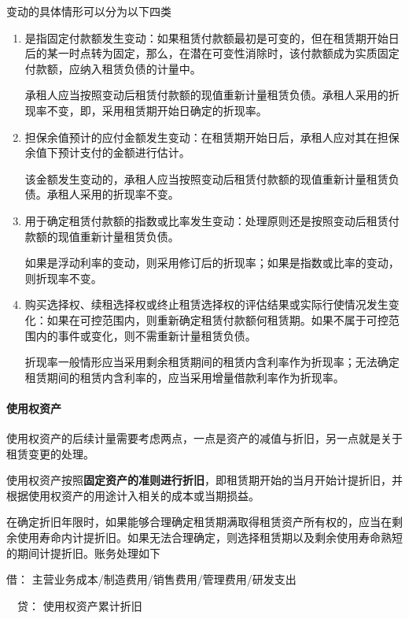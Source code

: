 \documentclass[UTF8,12pt]{ctexart}
\newenvironment{Dr}{\noindent 借：}{\par}
\newenvironment{Cr}{\noindent \ \ 贷：}{\par}
\numberwithin{equation}{section} %
\numberwithin{figure}{section}
\numberwithin{table}{section}
\begin{document}
	变动的具体情形可以分为以下四类
	\begin{enumerate}
		\item 是指固定付款额发生变动：如果租赁付款额最初是可变的，但在租赁期开始日后的某一时点转为固定，那么，在潜在可变性消除时，该付款额成为实质固定付款额，应纳入租赁负债的计量中。
		
		承租人应当按照变动后租赁付款额的现值重新计量租赁负债。承租人采用的折现率不变，即，采用租赁期开始日确定的折现率。
		
		\item 担保余值预计的应付金额发生变动：在租赁期开始日后，承租人应对其在担保余值下预计支付的金额进行估计。
		
		该金额发生变动的，承租人应当按照变动后租赁付款额的现值重新计量租赁负债。承租人采用的折现率不变。
		
		\item 用于确定租赁付款额的指数或比率发生变动：处理原则还是按照变动后租赁付款额的现值重新计量租赁负债。
		
		如果是浮动利率的变动，则采用修订后的折现率；如果是指数或比率的变动，则折现率不变。
		
		\item 购买选择权、续租选择权或终止租赁选择权的评估结果或实际行使情况发生变化：如果在可控范围内，则重新确定租赁付款额何租赁期。如果不属于可控范围内的事件或变化，则不需重新计量租赁负债。
		
		折现率一般情形应当采用剩余租赁期间的租赁内含利率作为折现率；无法确定租赁期间的租赁内含利率的，应当采用增量借款利率作为折现率。
	\end{enumerate}
	
	\paragraph{使用权资产}
	使用权资产的后续计量需要考虑两点，一点是资产的减值与折旧，另一点就是关于租赁变更的处理。
	
	使用权资产按照\textbf{固定资产的准则进行折旧}，即租赁期开始的当月开始计提折旧，并根据使用权资产的用途计入相关的成本或当期损益。
	
	在确定折旧年限时，如果能够合理确定租赁期满取得租赁资产所有权的，应当在剩余使用寿命内计提折旧。如果无法合理确定，则选择租赁期以及剩余使用寿命熟短的期间计提折旧。账务处理如下
	
	\begin{Dr}
		主营业务成本/制造费用/销售费用/管理费用/研发支出
	\end{Dr}
	\begin{Cr}
		使用权资产累计折旧
	\end{Cr}
\end{document}
